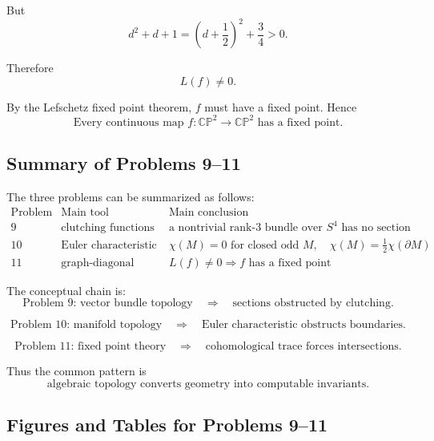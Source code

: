 \documentclass[12pt,a4paper]{article}
\theoremstyle{notespace}
\begin{document}
But
\[
d^2+d+1
=
\left(d+\frac12\right)^2+\frac34
>0.
\]

Therefore
\[
L(f)\neq 0.
\]

By the Lefschetz fixed point theorem, \(f\) must have a fixed point. Hence
\[
\boxed{
	\text{Every continuous map }f:\mathbb{CP}^2\to\mathbb{CP}^2
	\text{ has a fixed point.}
}
\]

\subsection{Summary of Problems 9--11}

The three problems can be summarized as follows:
\[
\begin{array}{c|c|c}
	\text{Problem} & \text{Main tool} & \text{Main conclusion} \\
	\hline
	9
	&
	\text{clutching functions}
	&
	\text{a nontrivial rank-}3\text{ bundle over }S^4\text{ has no section}
	\\[1mm]
	10
	&
	\text{Euler characteristic and doubling}
	&
	\chi(M)=0\text{ for closed odd }M,\quad
	\chi(M)=\frac12\chi(\partial M)
	\\[1mm]
	11
	&
	\text{graph-diagonal intersection}
	&
	L(f)\neq 0\Rightarrow f\text{ has a fixed point}
\end{array}
\]

The conceptual chain is:
\[
\text{Problem 9: vector bundle topology}
\quad\Longrightarrow\quad
\text{sections obstructed by clutching}.
\]

\[
\text{Problem 10: manifold topology}
\quad\Longrightarrow\quad
\text{Euler characteristic obstructs boundaries}.
\]

\[
\text{Problem 11: fixed point theory}
\quad\Longrightarrow\quad
\text{cohomological trace forces intersections}.
\]

Thus the common pattern is
\[
\boxed{
	\text{algebraic topology converts geometry into computable invariants.}
}
\]	
	
\FloatBarrier


\subsection{Figures and Tables for Problems 9--11}
\end{document}
